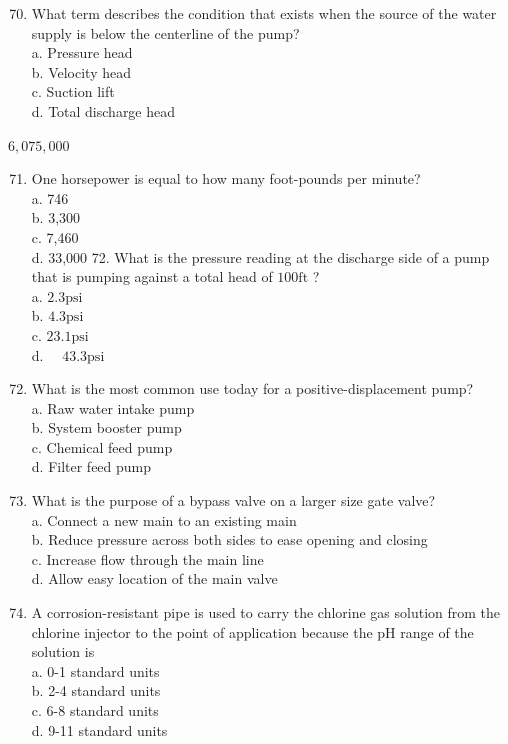 \documentclass[10pt]{article}
\begin{document}
\begin{enumerate}
  \setcounter{enumi}{69}
  \item What term describes the condition that exists when the source of the water supply is below the centerline of the pump?\\
a. Pressure head\\
b. Velocity head\\
c. Suction lift\\
d. Total discharge head
\end{enumerate}

$6,075,000$

\begin{enumerate}
  \setcounter{enumi}{70}
  \item One horsepower is equal to how many foot-pounds per minute?\\
a. 746\\
b. 3,300\\
c. 7,460\\
d. 33,000 72. What is the pressure reading at the discharge side of a pump that is pumping against a total head of $100 \mathrm{ft}$ ?\\
a. $2.3 \mathrm{psi}$\\
b. $4.3 \mathrm{psi}$\\
c. $23.1 \mathrm{psi}$\\
d. $\quad 43.3 \mathrm{psi}$

  \item What is the most common use today for a positive-displacement pump?\\
a. Raw water intake pump\\
b. System booster pump\\
c. Chemical feed pump\\
d. Filter feed pump

  \item What is the purpose of a bypass valve on a larger size gate valve?\\
a. Connect a new main to an existing main\\
b. Reduce pressure across both sides to ease opening and closing\\
c. Increase flow through the main line\\
d. Allow easy location of the main valve

  \item A corrosion-resistant pipe is used to carry the chlorine gas solution from the chlorine injector to the point of application because the $\mathrm{pH}$ range of the solution is\\
a. 0-1 standard units\\
b. 2-4 standard units\\
c. 6-8 standard units\\
d. 9-11 standard units


\end{enumerate}
\end{document}
